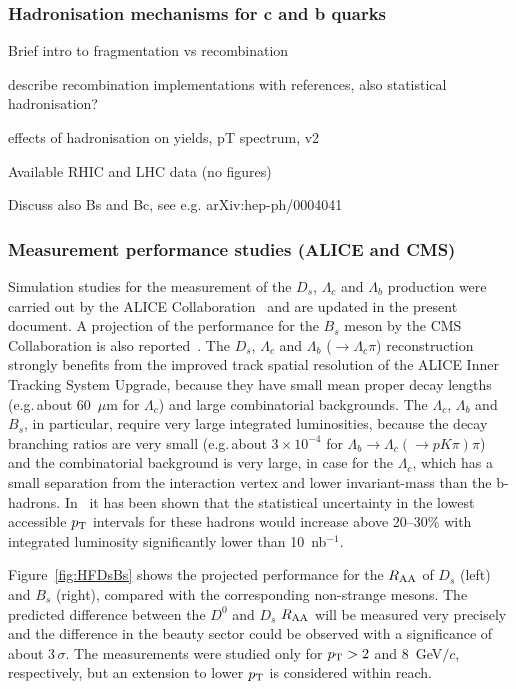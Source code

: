 \subsubsection{Hadronisation mechanisms for c and b quarks}

Brief intro to fragmentation vs recombination

describe recombination implementations with references,
also statistical hadronisation?

effects of hadronisation on yields, pT spectrum, v2

Available RHIC and LHC data (no figures)

Discuss also Bs and Bc, see e.g. arXiv:hep-ph/0004041

\subsubsection{Measurement performance studies (ALICE and CMS)}

Simulation studies for the measurement of the $D_s$, $\Lambda_c$ and $\Lambda_b$
production were carried out by the ALICE Collaboration~\cite{ITSTDR} and are updated in the present document. A projection of the performance for the $B_s$ meson by the CMS Collaboration is also reported~\cite{CMSFTR2017}. The $D_s$, $\Lambda_c$ and $\Lambda_b$ ($\to\Lambda_c\pi$) reconstruction strongly benefits from the improved track spatial resolution of the ALICE Inner Tracking System Upgrade, because they have small mean proper decay lengths (e.g.\,about 60~$\mu$m for $\Lambda_c$)
and large combinatorial backgrounds. The $\Lambda_c$, $\Lambda_b$ and $B_s$, in particular, require very large integrated luminosities, because the decay branching ratios are very small (e.g.\,about $3\times 10^{-4}$ for $\Lambda_b\to\Lambda_c(\to pK\pi)\pi$) and the combinatorial background is very large, in case for the $\Lambda_c$, which has a small separation from the interaction vertex and lower invariant-mass than the b-hadrons. In~\cite{CMSFTR2017} it has been shown that the statistical uncertainty in the lowest accessible $p_{\rm T}$ intervals for these hadrons would increase above 20--30\% with integrated luminosity significantly lower than 10~nb$^{-1}$.

Figure~\ref{fig:HFDsBs} shows the projected performance for the $R_{\rm AA}$ of $D_s$ (left) and $B_s$ (right), compared with the corresponding non-strange mesons. The predicted difference between the $D^0$ and $D_s$ $R_{\rm AA}$ will be measured very precisely and the difference in the beauty sector could be observed with a significance of about 3\,$\sigma$.
The measurements were studied only for $p_{\rm T}>2$ and 8~GeV$/c$, respectively, but an extension to lower $p_{\rm T}$ is considered within reach.

